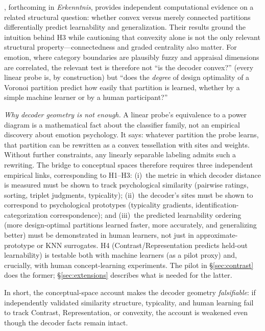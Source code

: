 \documentclass[11pt]{article}
\begin{document}
\citet{douven-verheyen-2026}, forthcoming in \emph{Erkenntnis}, provides independent computational evidence on a related structural question: whether convex versus merely connected partitions differentially predict learnability and generalization. Their results ground the intuition behind H3 while cautioning that convexity alone is not the only relevant structural property---connectedness and graded centrality also matter. For emotion, where category boundaries are plausibly fuzzy and appraisal dimensions are correlated, the relevant test is therefore not ``is the decoder convex?'' (every linear probe is, by construction) but ``does the \emph{degree} of design optimality of a Voronoi partition predict how easily that partition is learned, whether by a simple machine learner or by a human participant?''

\emph{Why decoder geometry is not enough.} A linear probe's equivalence to a power diagram \citep{aurenhammer1987power} is a mathematical fact about the classifier family, not an empirical discovery about emotion psychology. It says: whatever partition the probe learns, that partition can be rewritten as a convex tessellation with sites and weights. Without further constraints, any linearly separable labeling admits such a rewriting. The bridge to conceptual spaces therefore requires three independent empirical links, corresponding to H1--H3: (i)~the metric in which decoder distance is measured must be shown to track psychological similarity (pairwise ratings, sorting, triplet judgments, typicality); (ii)~the decoder's sites must be shown to correspond to psychological prototypes (typicality gradients, identification-categorization correspondence); and (iii)~the predicted learnability ordering (more design-optimal partitions learned faster, more accurately, and generalizing better) must be demonstrated in human learners, not just in approximate-prototype or KNN surrogates. H4 (Contrast/Representation predicts held-out learnability) is testable both with machine learners (as a pilot proxy) and, crucially, with human concept-learning experiments. The pilot in \S\ref{sec:contrast} does the former; \S\ref{sec:extensions} describes what is needed for the latter.

In short, the conceptual-space account makes the decoder geometry \emph{falsifiable}: if independently validated similarity structure, typicality, and human learning fail to track Contrast, Representation, or convexity, the account is weakened even though the decoder facts remain intact.
\end{document}
